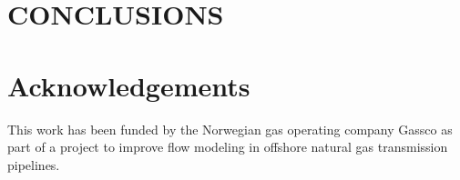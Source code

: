 \documentclass{mekit17}
\begin{document}
\section{CONCLUSIONS}
\label{conclusion}


\section*{Acknowledgements}
This work has been funded by the Norwegian gas operating company Gassco as part of a project to improve flow modeling in offshore natural gas transmission pipelines. 

\printbibliography
\end{document}
